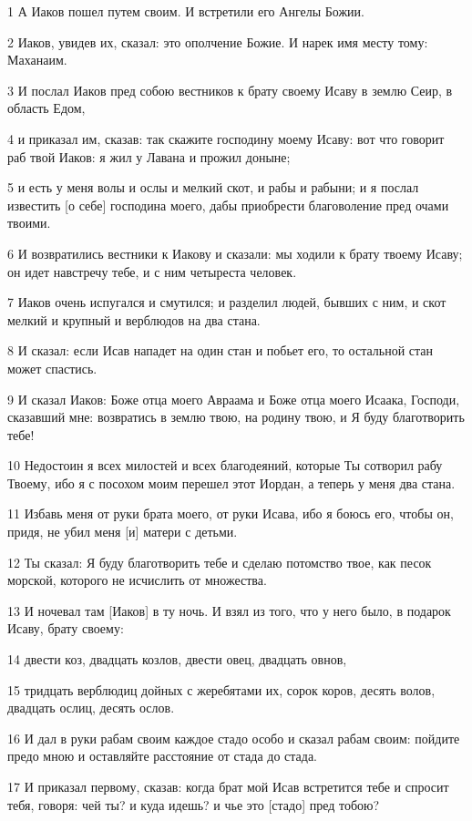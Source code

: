 \par 1 А Иаков пошел путем своим. И встретили его Ангелы Божии.
\par 2 Иаков, увидев их, сказал: это ополчение Божие. И нарек имя месту тому: Маханаим.
\par 3 И послал Иаков пред собою вестников к брату своему Исаву в землю Сеир, в область Едом,
\par 4 и приказал им, сказав: так скажите господину моему Исаву: вот что говорит раб твой Иаков: я жил у Лавана и прожил доныне;
\par 5 и есть у меня волы и ослы и мелкий скот, и рабы и рабыни; и я послал известить [о себе] господина моего, дабы приобрести благоволение пред очами твоими.
\par 6 И возвратились вестники к Иакову и сказали: мы ходили к брату твоему Исаву; он идет навстречу тебе, и с ним четыреста человек.
\par 7 Иаков очень испугался и смутился; и разделил людей, бывших с ним, и скот мелкий и крупный и верблюдов на два стана.
\par 8 И сказал: если Исав нападет на один стан и побьет его, то остальной стан может спастись.
\par 9 И сказал Иаков: Боже отца моего Авраама и Боже отца моего Исаака, Господи, сказавший мне: возвратись в землю твою, на родину твою, и Я буду благотворить тебе!
\par 10 Недостоин я всех милостей и всех благодеяний, которые Ты сотворил рабу Твоему, ибо я с посохом моим перешел этот Иордан, а теперь у меня два стана.
\par 11 Избавь меня от руки брата моего, от руки Исава, ибо я боюсь его, чтобы он, придя, не убил меня [и] матери с детьми.
\par 12 Ты сказал: Я буду благотворить тебе и сделаю потомство твое, как песок морской, которого не исчислить от множества.
\par 13 И ночевал там [Иаков] в ту ночь. И взял из того, что у него было, в подарок Исаву, брату своему:
\par 14 двести коз, двадцать козлов, двести овец, двадцать овнов,
\par 15 тридцать верблюдиц дойных с жеребятами их, сорок коров, десять волов, двадцать ослиц, десять ослов.
\par 16 И дал в руки рабам своим каждое стадо особо и сказал рабам своим: пойдите предо мною и оставляйте расстояние от стада до стада.
\par 17 И приказал первому, сказав: когда брат мой Исав встретится тебе и спросит тебя, говоря: чей ты? и куда идешь? и чье это [стадо] пред тобою?
